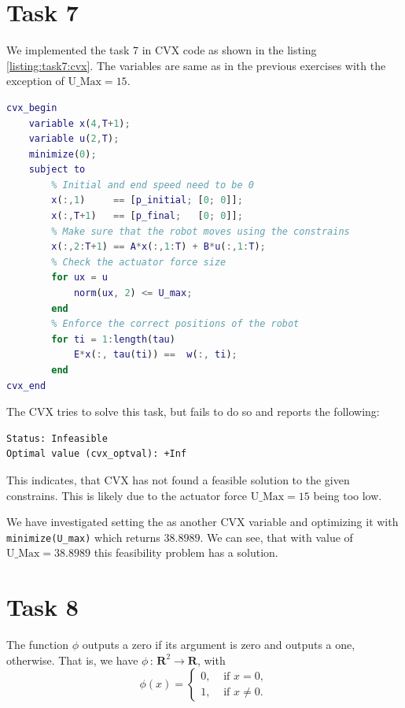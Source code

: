 \section{Task 7}

We implemented the task 7 in CVX code as shown in the listing \ref{listing:task7:cvx}. The variables are same as in the previous exercises with the exception of $\text{U\_Max}=15$.

\begin{lstlisting}[language=Matlab, caption=CVX code for task 7., label=listing:task7:cvx, float=!htb]
cvx_begin
    variable x(4,T+1);
    variable u(2,T);
    minimize(0);
    subject to
        % Initial and end speed need to be 0
        x(:,1)     == [p_initial; [0; 0]];
        x(:,T+1)   == [p_final;   [0; 0]];
        % Make sure that the robot moves using the constrains
        x(:,2:T+1) == A*x(:,1:T) + B*u(:,1:T);
        % Check the actuator force size
        for ux = u
            norm(ux, 2) <= U_max; 
        end
        % Enforce the correct positions of the robot
        for ti = 1:length(tau)
            E*x(:, tau(ti)) ==  w(:, ti);
        end
cvx_end
\end{lstlisting}

The CVX tries to solve this task, but fails to do so and reports the following:
\begin{lstlisting}
Status: Infeasible
Optimal value (cvx_optval): +Inf
\end{lstlisting}

This indicates, that CVX has not found a feasible solution to the given constrains. This is likely due to the actuator force $\text{U\_Max}=15$ being too low. 

We have investigated setting the  as another CVX variable and optimizing it with \lstinline{minimize(U_max)} which returns $38.8989$. We can see, that with value of $\text{U\_Max}=38.8989$ this feasibility problem has a solution.

\section{Task 8}
The function $\phi$ outputs a zero if its argument is zero and outputs a one, otherwise. That is, we have $\phi\,:\,{\mathbf R}^2 \rightarrow {\mathbf R}$, with $$\phi(x) = \left\{ \begin{array}{ll} 0,  & \text{ if } x = 0, \\ 1, & \text{ if }x \neq 0. \end{array} \right.$$

